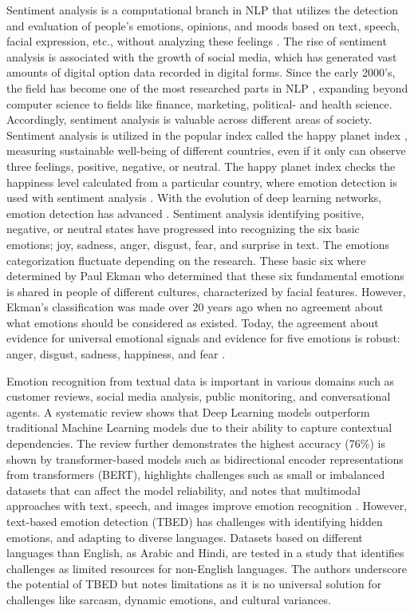 Sentiment analysis is a computational branch in NLP that utilizes the detection and evaluation of people’s emotions, opinions, and moods based on text, speech, facial expression, etc., without analyzing these feelings \autocite{Ermakova2023}. The rise of sentiment analysis is associated with the growth of social media, which has generated vast amounts of digital option data recorded in digital forms. Since the early 2000’s, the field has become one of the most researched parts in NLP \autocite{Zhang2018}, expanding beyond computer science to fields like finance, marketing, political- and health science. Accordingly, sentiment analysis is valuable across different areas of society. Sentiment analysis is utilized in the popular index called the happy planet index \autocite{HappyPlanetIndex}, measuring sustainable well-being of different countries, even if it only can observe three feelings, positive, negative, or neutral. The happy planet index checks the happiness level calculated from a particular country, where emotion detection is used with sentiment analysis \autocite{Madhuri2021}.
With the evolution of deep learning networks, emotion detection has advanced \autocite{Safari2023}. Sentiment analysis identifying positive, negative, or neutral states have progressed into recognizing the six basic emotions; joy, sadness, anger, disgust, fear, and surprise in text. The emotions categorization fluctuate depending on the research. These basic six where determined by Paul Ekman \autocite{Oatley2019, Kusal2023} who determined that these six fundamental emotions is shared in people of different cultures, characterized by facial features. However, Ekman’s classification was made over 20 years ago when no agreement about what emotions should be considered as existed. Today, the agreement about evidence for universal emotional signals and evidence for five emotions is robust: anger, disgust, sadness, happiness, and fear \autocite{Ekman2016}.

Emotion recognition from textual data is important in various domains such as customer reviews, social media analysis, public monitoring, and conversational agents. A systematic review \autocite{Kusal2023} shows that Deep Learning models outperform traditional Machine Learning models due to their ability to capture contextual dependencies. The review further demonstrates the highest accuracy (76\%) is shown by transformer-based models such as bidirectional encoder representations from transformers (BERT), highlights challenges such as small or imbalanced datasets that can affect the model reliability, and notes that multimodal approaches with text, speech, and images improve emotion recognition \autocite{Madhuri2021}. However, text-based emotion detection (TBED) has challenges with identifying hidden emotions, and adapting to diverse languages. Datasets based on different languages than English, as Arabic and Hindi, are tested in a study \autocite{Maruf2024} that identifies challenges as limited resources for non-English languages. The authors underscore the potential of TBED but notes limitations as it is no universal solution for challenges like sarcasm, dynamic emotions, and cultural variances.

